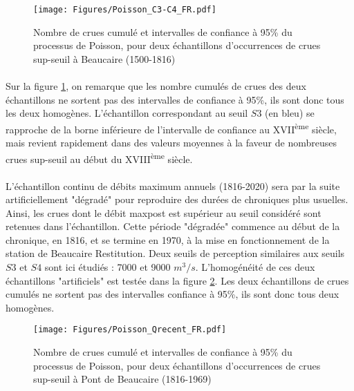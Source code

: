 \documentclass[11pt]{article}
\begin{document}
	\begin{figure}[h]
		\centering
		\texttt{[image: Figures/Poisson\_C3-C4\_FR.pdf]}	
		\caption{Nombre de crues cumulé et intervalles de confiance à 95\% du processus de 						Poisson, pour deux échantillons d'occurrences de crues sup-seuil à Beaucaire 							(1500-1816)}
		\label{fig:Poisson_C3-C4}
	\end{figure}		
	
	\paragraph{} Sur la figure \ref{fig:Poisson_C3-C4}, on remarque que les nombre cumulés de crues des deux échantillons ne sortent pas des intervalles de confiance à 95\%, ils sont donc tous les deux homogènes. L'échantillon correspondant au seuil $S3$ (en bleu) se rapproche de la borne inférieure de l'intervalle de confiance au XVII\textsuperscript{ème} siècle, mais revient rapidement dans des valeurs moyennes à la faveur de nombreuses crues sup-seuil au début du XVIII\textsuperscript{ème} siècle. 
	
	\paragraph{} L'échantillon continu de débits maximum annuels (1816-2020) sera par la suite artificiellement "dégradé" pour reproduire des durées de chroniques plus usuelles. Ainsi, les crues dont le débit maxpost est supérieur au seuil considéré sont retenues dans l'échantillon. Cette période "dégradée" commence au début de la chronique, en 1816, et se termine en 1970, à la mise en fonctionnement de la station de Beaucaire Restitution. Deux seuils de perception similaires aux seuils $S3$ et $S4$ sont ici étudiés : 7000 et 9000 $m^3/s$. L'homogénéité de ces deux échantillons "artificiels" est testée dans la figure \ref{fig:Poisson_Recent}. Les deux échantillons de crues cumulés ne sortent pas des intervalles confiance à 95\%, ils sont donc tous deux homogènes. 
	
	\begin{figure}[h]
		\centering
		\texttt{[image: Figures/Poisson\_Qrecent\_FR.pdf]}	
		\caption{Nombre de crues cumulé et intervalles de confiance à 95\% du processus de 						Poisson, pour deux échantillons d'occurrences de crues sup-seuil à Pont de Beaucaire 							(1816-1969)}
		\label{fig:Poisson_Recent}
	\end{figure}
	
\end{document}
